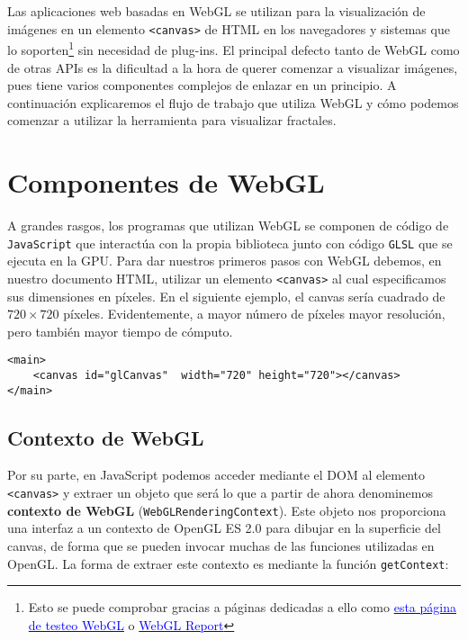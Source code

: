 Las aplicaciones web basadas en WebGL se utilizan para la visualización de imágenes en un elemento \verb|<canvas>| de HTML en los navegadores y sistemas que lo soporten\footnote{Esto se puede comprobar gracias a páginas dedicadas a ello como \href{https://get.webgl.org/}{\textcolor{blue}{esta página de testeo WebGL}} o \href{http://webglreport.com/}{\textcolor{blue}{WebGL Report}}} sin necesidad de plug-ins. El principal defecto tanto de WebGL como de otras APIs es la dificultad a la hora de querer comenzar a visualizar imágenes, pues tiene varios componentes complejos de enlazar en un principio. A continuación explicaremos el flujo de trabajo que utiliza WebGL y cómo podemos comenzar a utilizar la herramienta para visualizar fractales.

\section{Componentes de WebGL}
\label{section:componentes-wgl}

A grandes rasgos, los programas que utilizan WebGL se componen de código de \verb|JavaScript| que interactúa con la propia biblioteca junto con código \verb|GLSL| que se ejecuta en la GPU. Para dar nuestros primeros pasos con WebGL debemos, en nuestro documento HTML, utilizar un elemento \verb|<canvas>| al cual especificamos sus dimensiones en píxeles. En el siguiente ejemplo, el canvas sería cuadrado de $720\times 720$ píxeles. Evidentemente, a mayor número de píxeles mayor resolución, pero también mayor tiempo de cómputo.

\begin{lstlisting}
<main>
    <canvas id="glCanvas"  width="720" height="720"></canvas>
</main>
\end{lstlisting}

\subsection{Contexto de WebGL}

Por su parte, en JavaScript podemos acceder mediante el DOM al elemento \verb|<canvas>| y extraer un objeto que será lo que a partir de ahora denominemos \textbf{contexto de WebGL} (\verb|WebGLRenderingContext|). Este objeto nos proporciona una interfaz a un contexto de OpenGL ES 2.0 para dibujar en la superficie del canvas, de forma que se pueden invocar muchas de las funciones utilizadas en OpenGL. La forma de extraer este contexto es mediante la función \verb|getContext|:

